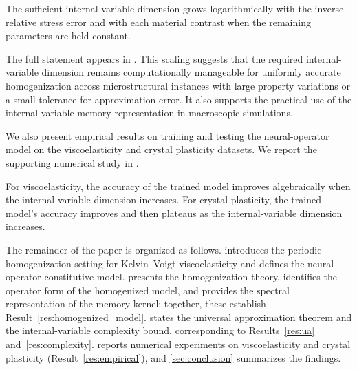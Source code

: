 \documentclass[3p, 12pt, preprint]{elsarticle}
\begin{document}
\begin{mainresult}\label{res:complexity}
{\color{blue}The sufficient internal-variable dimension grows logarithmically with the inverse relative stress error and with each material contrast when the remaining parameters are held constant.}
\end{mainresult}

The full statement appears in .
This scaling suggests that the required internal-variable dimension remains computationally manageable for uniformly accurate homogenization across microstructural instances with large property variations or a small tolerance for approximation error. It also supports the practical use of the internal-variable memory representation in macroscopic simulations.

We also present empirical results on training and testing the neural-operator model on the viscoelasticity and crystal plasticity datasets. We report the supporting numerical study in .

\begin{mainresult}\label{res:empirical} For viscoelasticity, the accuracy of the trained model improves algebraically when the internal-variable dimension increases. For crystal plasticity, the trained model's accuracy improves and then plateaus as the internal-variable dimension increases.
\end{mainresult}

The remainder of the paper is organized as follows.  introduces the periodic homogenization setting for Kelvin--Voigt viscoelasticity and defines the neural operator constitutive model.  presents the homogenization theory, identifies the operator form of the homogenized model, and provides the spectral representation of the memory kernel; together, these establish Result~\ref{res:homogenized_model}.  states the universal approximation theorem and the internal-variable complexity bound, corresponding to Results~\ref{res:ua} and~\ref{res:complexity}.  reports numerical experiments on viscoelasticity and crystal plasticity (Result~\ref{res:empirical}), and \cref{sec:conclusion} summarizes the findings.
\end{document}
